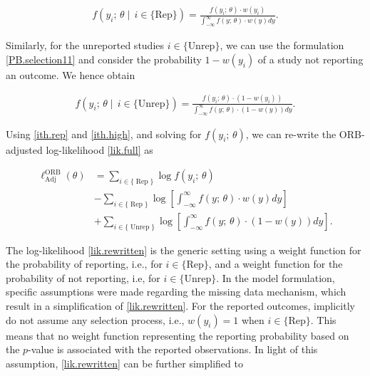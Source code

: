 \documentclass[twocolumn]{article}\usepackage[]{graphicx}\usepackage[]{xcolor}
\begin{document}
\bigskip

\begin{equation}
\label{ith.rep}
\begin{aligned}
f\left(y_i \text{; } \theta \mid  \, i \in \{\text{Rep}\} \right) = \frac{f\left(y_i \text{; } \theta \right) \cdot w(y_i)}{\int_{-\infty}^{\infty} f\left(y \text{; } \theta \right) \cdot w(y) d y} \text{.}
\end{aligned}
\end{equation}

\bigskip

Similarly, for the unreported studies $i \in \{\text{Unrep} \}$, we can use the formulation \eqref{PB.selection11} and consider the probability $1-w(y_i)$ of a study not reporting an outcome. We hence obtain

\bigskip

\begin{equation}
\label{ith.high}
\begin{aligned}
f\left(y_i \text{; } \theta \mid \, i \in \{\text{Unrep} \} \right) = \frac{f \left(y_i \text{; } \theta \right) \cdot \left(1-w(y_i) \right)}{\int_{-\infty}^{\infty} f \left(y \text{; } \theta \right) \cdot \left(1-w(y) \right) d y} \text{.}
\end{aligned}
\end{equation}

\bigskip

Using \eqref{ith.rep} and \eqref{ith.high}, and solving for $f(y_i \text{; } \theta)$, we can re-write the ORB-adjusted log-likelihood \eqref{lik.full} as

\bigskip


\begin{equation}
\label{lik.rewritten}
\begin{aligned}
\ell_{\text{Adj}}^{\text{ORB}} \left(\theta \right) & = \sum_{i \in \{\operatorname{Rep} \} } \log  f(y_i \text{; } \theta)\\
& - \sum_{i \in \{\operatorname{Rep} \} } \log \left[ \int_{-\infty}^{\infty} f\left(y \text{; } \theta \right) \cdot w(y) dy \right]\\
& + \sum_{i \in \{ \operatorname{Unrep} \}} \log \left[ \int_{-\infty}^{\infty} f(y \text{; } \theta) \cdot \left( 1 - w(y) \right) d y \right] \text{.}
\end{aligned}
\end{equation}

\bigskip


The log-likelihood \eqref{lik.rewritten} is the generic setting using a weight function for the probability of reporting, i.e., for $i \in \{\text{Rep} \}$, and a weight function for the probability of not reporting, i.e, for $i \in \{\text{Unrep} \}$. In the \citet{Copas2019} model formulation, specific assumptions were made regarding the missing data mechanism, which result in a simplification of \eqref{lik.rewritten}. For the reported outcomes, \citet{Copas2019} implicitly do not assume any selection process, i.e., $w(y_i)=1$ when $i \in \{\text{Rep} \}$. This means that no weight function representing the reporting probability based on the $p$-value is associated with the reported observations. In light of this assumption, \eqref{lik.rewritten} can be further simplified to
\end{document}
